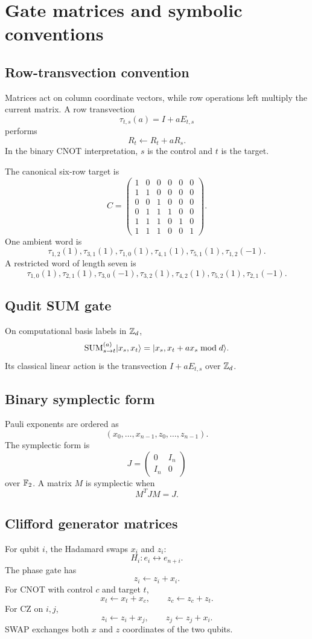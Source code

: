 \chapter{Gate matrices and symbolic conventions}\label{app:gate-matrices}


\section{Row-transvection convention}
Matrices act on column coordinate vectors, while row operations left multiply the current matrix.  A row transvection
\[
\tau_{t,s}(a)=I+aE_{t,s}
\]
performs
\[
R_t\leftarrow R_t+aR_s.
\]
In the binary CNOT interpretation, $s$ is the control and $t$ is the target.

The canonical six-row target is
\[
C=
\begin{pmatrix}
1&0&0&0&0&0\\
1&1&0&0&0&0\\
0&0&1&0&0&0\\
0&1&1&1&0&0\\
1&1&1&0&1&0\\
1&1&1&0&0&1
\end{pmatrix}.
\]
One ambient word is
\[
\tau_{1,2}(1),
\tau_{3,1}(1),
\tau_{1,0}(1),
\tau_{4,1}(1),
\tau_{5,1}(1),
\tau_{1,2}(-1).
\]
A restricted word of length seven is
\[
\tau_{1,0}(1),
\tau_{2,1}(1),
\tau_{3,0}(-1),
\tau_{3,2}(1),
\tau_{4,2}(1),
\tau_{5,2}(1),
\tau_{2,1}(-1).
\]

\section{Qudit SUM gate}
On computational basis labels in $\mathbb Z_d$,
\[
\operatorname{SUM}^{(a)}_{s\to t}
\lvert x_s,x_t\rangle
=
\lvert x_s,x_t+a x_s\bmod d\rangle.
\]
Its classical linear action is the transvection $I+aE_{t,s}$ over $\mathbb Z_d$.

\section{Binary symplectic form}
Pauli exponents are ordered as
\[
(x_0,\ldots,x_{n-1},z_0,\ldots,z_{n-1}).
\]
The symplectic form is
\[
J=
\begin{pmatrix}
0&I_n\\
I_n&0
\end{pmatrix}
\]
over $\mathbb F_2$.  A matrix $M$ is symplectic when
\[
M^TJM=J.
\]

\section{Clifford generator matrices}
For qubit $i$, the Hadamard swaps $x_i$ and $z_i$:
\[
H_i:e_i\leftrightarrow e_{n+i}.
\]
The phase gate has
\[
z_i\leftarrow z_i+x_i.
\]
For CNOT with control $c$ and target $t$,
\[
x_t\leftarrow x_t+x_c,
\qquad
z_c\leftarrow z_c+z_t.
\]
For CZ on $i,j$,
\[
z_i\leftarrow z_i+x_j,
\qquad
z_j\leftarrow z_j+x_i.
\]
SWAP exchanges both $x$ and $z$ coordinates of the two qubits.

